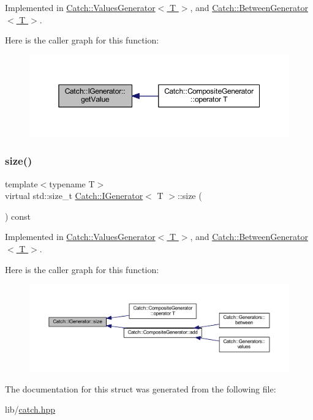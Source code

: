 Implemented in \hyperlink{class_catch_1_1_values_generator_a9674c8b70d562d2d68154de92dd1810a}{Catch\+::\+Values\+Generator$<$ T $>$}, and \hyperlink{class_catch_1_1_between_generator_a913f74bb0c23b3bc0127abfffdabbd94}{Catch\+::\+Between\+Generator$<$ T $>$}.

Here is the caller graph for this function\+:\nopagebreak
\begin{figure}[H]
\begin{center}
\leavevmode
\includegraphics[width=350pt]{struct_catch_1_1_i_generator_ad69e937cb66dba3ed9429c42abf4fce3_icgraph}
\end{center}
\end{figure}
\hypertarget{struct_catch_1_1_i_generator_a2e317253b03e838b6065ce69719a198e}{}\label{struct_catch_1_1_i_generator_a2e317253b03e838b6065ce69719a198e} 
\subsubsection{\texorpdfstring{size()}{size()}}
{\footnotesize\ttfamily template$<$typename T$>$ \\
virtual std\+::size\+\_\+t \hyperlink{struct_catch_1_1_i_generator}{Catch\+::\+I\+Generator}$<$ T $>$\+::size (\begin{DoxyParamCaption}{ }\end{DoxyParamCaption}) const\hspace{0.3cm}{\ttfamily [pure virtual]}}



Implemented in \hyperlink{class_catch_1_1_values_generator_a9aa5b140ee502975cf35115e534ab771}{Catch\+::\+Values\+Generator$<$ T $>$}, and \hyperlink{class_catch_1_1_between_generator_af65a1fe51f9b1106fc676e3dd189adb6}{Catch\+::\+Between\+Generator$<$ T $>$}.

Here is the caller graph for this function\+:\nopagebreak
\begin{figure}[H]
\begin{center}
\leavevmode
\includegraphics[width=350pt]{struct_catch_1_1_i_generator_a2e317253b03e838b6065ce69719a198e_icgraph}
\end{center}
\end{figure}


The documentation for this struct was generated from the following file\+:\begin{DoxyCompactItemize}
\item 
lib/\hyperlink{catch_8hpp}{catch.\+hpp}\end{DoxyCompactItemize}
